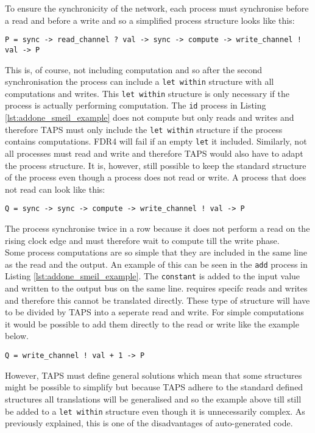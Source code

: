 To ensure the synchronicity of the network, each process must synchronise before a read and before a write and so a simplified process structure looks like this:
\begin{verbatim}
P = sync -> read_channel ? val -> sync -> compute -> write_channel ! val -> P
\end{verbatim}
This is, of course, not including computation and so after the second synchronisation the process can include a \texttt{let within} structure with all computations and writes. This \texttt{let within} structure is only necessary if the process is actually performing computation. The \texttt{id} process in Listing \ref{lst:addone_smeil_example} does not compute but only reads and writes and therefore TAPS must only include the \texttt{let within} structure if the process contains computations. FDR4 will fail if an empty \texttt{let} it included. Similarly, not all processes must read and write and therefore TAPS would also have to adapt the process structure. It is, however, still possible to keep the standard structure of the process even though a process does not read or write. A process that does not read can look like this:
\begin{verbatim}
Q = sync -> sync -> compute -> write_channel ! val -> P
\end{verbatim}
The process synchronise twice in a row because it does not perform a read on the rising clock edge and must therefore wait to compute till the write phase. \\

Some process computations are so simple that they are included in the same line as the read and the output. An example of this can be seen in the \texttt{add} process in Listing \ref{lst:addone_smeil_example}. The \texttt{constant} is added to the input value and written to the output bus on the same line. \cspm{} requires specifc reads and writes and therefore this cannot be translated directly. These type of structure will have to be divided by TAPS into a seperate read and write. For simple computations it would be possible to add them directly to the read or write like the example below.
\begin{verbatim}
Q = write_channel ! val + 1 -> P
\end{verbatim}
However, TAPS must define general solutions which mean that some structures might be possible to simplify but because TAPS adhere to the standard defined structures all translations will be generalised and so the example above till still be added to a \texttt{let within} structure even though it is unnecessarily complex. As previously explained, this is one of the disadvantages of auto-generated code. \\

